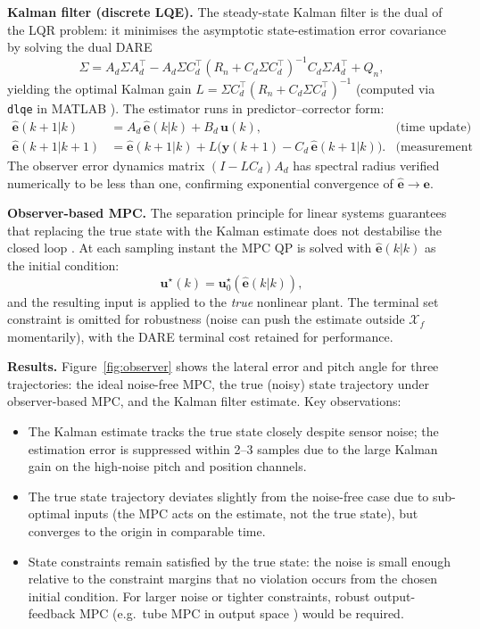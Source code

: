 \documentclass[11pt,a4paper]{article}
\newcommand{\vect}[1]{\bm{#1}}
\newcommand{\xf}{\mathcal{X}_f}
\begin{document}
\textbf{Kalman filter (discrete LQE).}
The steady-state Kalman filter is the dual of the LQR problem: it minimises the
asymptotic state-estimation error covariance by solving the dual DARE
\begin{equation}
  \Sigma = A_d \Sigma A_d^\top
         - A_d \Sigma C_d^\top(R_n + C_d \Sigma C_d^\top)^{-1} C_d \Sigma A_d^\top
         + Q_n,
\end{equation}
yielding the optimal Kalman gain $L = \Sigma C_d^\top(R_n + C_d \Sigma C_d^\top)^{-1}$
(computed via \texttt{dlqe} in MATLAB \cite{AndersonMoore1990}).  The estimator
runs in predictor--corrector form:
\begin{align}
  \hat{\vect{e}}(k+1|k)   &= A_d\,\hat{\vect{e}}(k|k) + B_d\,\vect{u}(k),
    & \text{(time update)} \label{eq:kf_pred} \\
  \hat{\vect{e}}(k+1|k+1) &= \hat{\vect{e}}(k+1|k)
    + L\bigl(\vect{y}(k+1) - C_d\,\hat{\vect{e}}(k+1|k)\bigr).
    & \text{(measurement update)} \label{eq:kf_corr}
\end{align}
The observer error dynamics matrix $(I - L C_d)A_d$ has spectral radius verified
numerically to be less than one, confirming exponential convergence of
$\hat{\vect{e}} \to \vect{e}$.

\textbf{Observer-based MPC.}
The separation principle for linear systems guarantees that replacing the true
state with the Kalman estimate does not destabilise the closed loop
\cite{RawlingsMayne2017}.  At each sampling instant the MPC QP is solved
with $\hat{\vect{e}}(k|k)$ as the initial condition:
\begin{equation}
  \vect{u}^\star(k) = \vect{u}_0^\star\!\left(\hat{\vect{e}}(k|k)\right),
\end{equation}
and the resulting input is applied to the \emph{true} nonlinear plant.  The
terminal set constraint is omitted for robustness (noise can push the estimate
outside $\xf$ momentarily), with the DARE terminal cost retained for
performance.

\textbf{Results.}
Figure~\ref{fig:observer} shows the lateral error and pitch angle for three
trajectories: the ideal noise-free MPC, the true (noisy) state trajectory under
observer-based MPC, and the Kalman filter estimate.  Key observations:
\begin{itemize}[noitemsep]
  \item The Kalman estimate tracks the true state closely despite sensor noise;
        the estimation error is suppressed within 2--3 samples due to the large
        Kalman gain on the high-noise pitch and position channels.
  \item The true state trajectory deviates slightly from the noise-free case
        due to sub-optimal inputs (the MPC acts on the estimate, not the true
        state), but converges to the origin in comparable time.
  \item State constraints remain satisfied by the true state: the noise is
        small enough relative to the constraint margins that no violation occurs
        from the chosen initial condition.  For larger noise or tighter
        constraints, robust output-feedback MPC (e.g.\ tube MPC in output space
        \cite{Mayne2011}) would be required.
\end{itemize}
\end{document}
